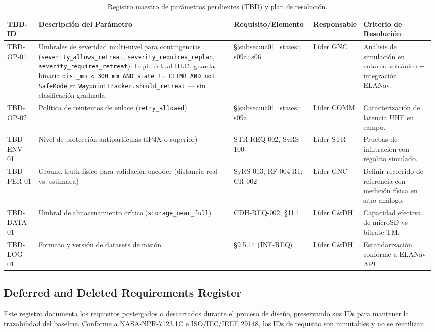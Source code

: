 \begin{table}[H]
\centering
\scriptsize
\begin{tabularx}{\textwidth}{| l | X | p{3.0cm} | p{2.2cm} | p{3.8cm} |}
\hline
\textbf{TBD-ID} & \textbf{Descripción del Parámetro} & \textbf{Requisito/Elemento} & \textbf{Responsable} & \textbf{Criterio de Resolución} \\ \hline
TBD-OP-01 & Umbrales de severidad multi-nivel para contingencias (\texttt{severity\_\allowbreak allows\_\allowbreak retreat}, \texttt{severity\_\allowbreak requires\_\allowbreak replan}, \texttt{severity\_\allowbreak requires\_\allowbreak retreat}). Impl.~actual HLC: guarda binaria \texttt{dist\_mm < 300\,mm AND state != CLIMB AND not SafeMode} en \texttt{WaypointTracker.should\_retreat} --- sin clasificación graduada. & \S\ref{subsec:uc01_states}; s09a; s06 & Líder GNC & Análisis de simulación en entorno volcánico + integración ELANav. \\ \hline
TBD-OP-02 & Política de reintentos de enlace (\texttt{retry\_allowed}) & \S\ref{subsec:uc01_states}; s09a & Líder COMM & Caracterización de latencia UHF en campo. \\ \hline
TBD-ENV-01 & Nivel de protección antipartículas (IP4X o superior) & STR-REQ-002, SyRS-100 & Líder STR & Pruebas de infiltración con regolito simulado. \\ \hline
TBD-PER-01 & Ground truth físico para validación encoder (distancia real vs. estimada) & SyRS-013, RF-004-R1; CR-002 & Líder GNC & Definir recorrido de referencia con medición física en sitio análogo. \\ \hline
TBD-DATA-01 & Umbral de almacenamiento crítico (\texttt{storage\_near\_full}) & CDH-REQ-002, §11.1 & Líder C\&DH & Capacidad efectiva de microSD vs bitrate TM. \\ \hline
TBD-LOG-01 & Formato y versión de datasets de misión & §9.5.14 (INF-REQ) & Líder C\&DH & Estandarización conforme a ELANav API. \\ \hline
\end{tabularx}
\caption{Registro maestro de parámetros pendientes (TBD) y plan de resolución.}
\end{table}

\subsection{Deferred and Deleted Requirements Register}\label{subsec:deferred-deleted}

Este registro documenta los requisitos postergados o descartados durante el proceso de diseño, preservando sus IDs para mantener la trazabilidad del baseline. Conforme a NASA-NPR-7123.1C e ISO/IEC/IEEE 29148, los IDs de requisito son inmutables y no se reutilizan. \cite{nasa_cm, segoldmine_ppi}

